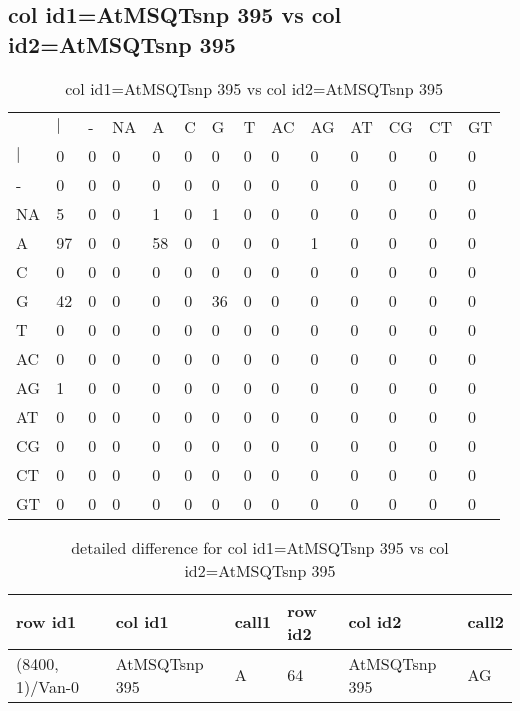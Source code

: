 \subsection{col id1=AtMSQTsnp 395 vs col id2=AtMSQTsnp 395}
\begin{center}
\begin{longtable}{|l|l|l|l|l|l|l|l|l|l|l|l|l|l|}
\caption{col id1=AtMSQTsnp 395 vs col id2=AtMSQTsnp 395} \label{table_dm706}\\
\hline
\\
\hline
&$|$&-&NA&A&C&G&T&AC&AG&AT&CG&CT&GT\\
$|$&0&0&0&0&0&0&0&0&0&0&0&0&0\\
-&0&0&0&0&0&0&0&0&0&0&0&0&0\\
NA&5&0&0&1&0&1&0&0&0&0&0&0&0\\
A&97&0&0&58&0&0&0&0&1&0&0&0&0\\
C&0&0&0&0&0&0&0&0&0&0&0&0&0\\
G&42&0&0&0&0&36&0&0&0&0&0&0&0\\
T&0&0&0&0&0&0&0&0&0&0&0&0&0\\
AC&0&0&0&0&0&0&0&0&0&0&0&0&0\\
AG&1&0&0&0&0&0&0&0&0&0&0&0&0\\
AT&0&0&0&0&0&0&0&0&0&0&0&0&0\\
CG&0&0&0&0&0&0&0&0&0&0&0&0&0\\
CT&0&0&0&0&0&0&0&0&0&0&0&0&0\\
GT&0&0&0&0&0&0&0&0&0&0&0&0&0\\
\hline
\end{longtable}
\end{center}

\begin{center}
\begin{longtable}{|l|l|l|l|l|l|}
\caption{detailed difference for col id1=AtMSQTsnp 395 vs col id2=AtMSQTsnp 395} \label{table_dm707}\\
\hline
row id1&col id1&call1&row id2&col id2&call2\\
\hline
(8400, 1)/Van-0&AtMSQTsnp 395&A&64&AtMSQTsnp 395&AG\\
\hline
\end{longtable}
\end{center}

